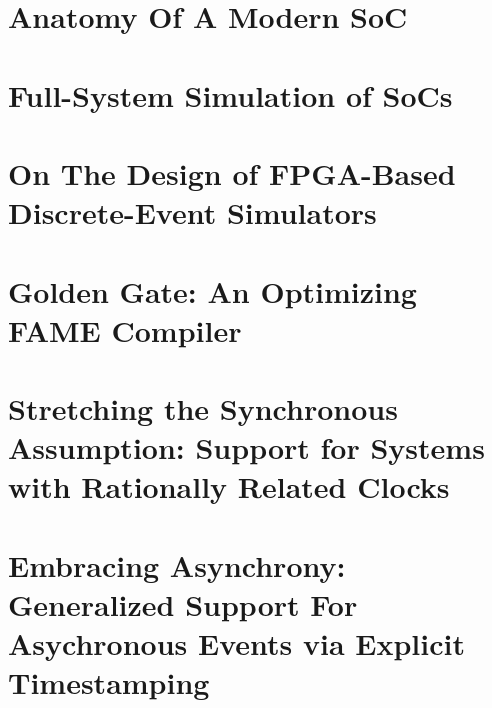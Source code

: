 \documentclass[phd]{ucbthesis}
\begin{document}
%

\chapter{Anatomy Of A Modern SoC}



\chapter{Full-System Simulation of SoCs}



\chapter{On The Design of FPGA-Based Discrete-Event Simulators}



\chapter{Golden Gate: An Optimizing FAME Compiler}\label{sec:golden-gate}

\chapter{Stretching the Synchronous Assumption: Support for Systems with Rationally Related Clocks}\label{sec:static-multiclock}

\chapter{Embracing Asynchrony: Generalized Support For Asychronous Events via Explicit Timestamping}\label{sec:dynamic-multiclock}
\end{document}

